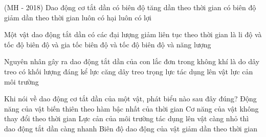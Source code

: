 \PhanI
\begin{ex} %
(MH - 2018) Dao động cơ tắt dần
\choice
{có biên độ tăng dần theo thời gian}
{\True có biên độ giảm dần theo thời gian}
{luôn có hại}
{luôn có lợi}
\end{ex} 
\begin{ex}%
Một vật dao động tắt dần có các đại lượng giảm liên tục theo thời gian là
\choice
{li độ và tốc độ}
{biên độ và gia tốc}
{biên độ và tốc độ}
{\True biên độ và năng lượng}
\end{ex} 
\begin{ex}%
Nguyên nhân gây ra dao động tắt dần của con lắc đơn trong không khí là do
\choice
{dây treo có khối lượng đáng kể}
{lực căng dây treo}
{trọng lực tác dụng lên vật}
{\True lực cản môi trường}
\end{ex} 
\begin{ex}%
Khi nói về dao động cơ tắt dần của một vật, phát biểu nào sau đây đúng?
\choice
{Động năng của vật biến thiên theo hàm bậc nhất của thời gian}
{Cơ năng của vật không thay đổi theo thời gian}
{Lực cản của môi trường tác dụng lên vật càng nhỏ thì dao động tắt dần càng nhanh}
{\True Biên độ dao động của vật giảm dần theo thời gian}
\end{ex} 

